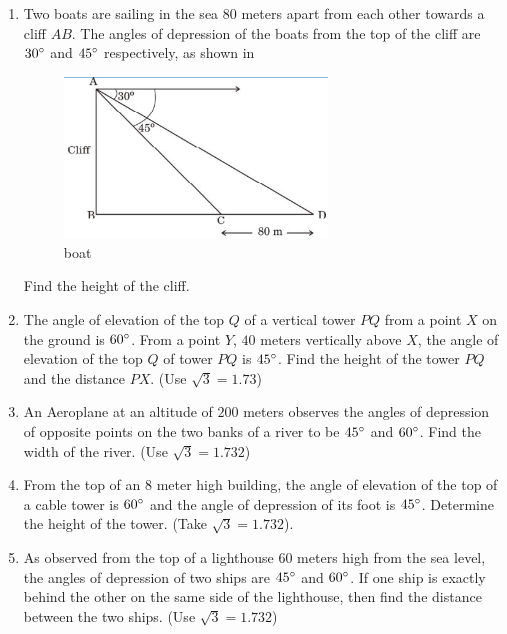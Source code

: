 \begin{enumerate}
    
    \hfill{}\item Two boats are sailing in the sea $80$ meters apart from each other towards a cliff $AB$. The angles of depression of the boats from the top of the cliff are $30\degree$ and $45\degree$ respectively, as shown in 
    
    \begin{figure}[H]
        \centering
        \includegraphics[width=70mm]{cbse-math/figs/boat.edit.jpeg}
        \caption{boat}
        \label{fig:boat.jpeg}
    \end{figure}
    
    Find the height of the cliff.
    
    \hfill{}\item The angle of elevation of the top $Q$ of a vertical tower $PQ$ from a point $X$ on the ground is $60\degree$. From a point $Y$, $40$ meters vertically above $X$, the angle of elevation of the top $Q$ of tower $PQ$ is $45\degree$. Find the height of the tower $PQ$ and the distance $PX$. (Use $\sqrt{3} = 1.73$)
    
    \hfill{}\item An Aeroplane at an altitude of $200$ meters observes the angles of depression of opposite points on the two banks of a river to be $45\degree$ and $60\degree$. Find the width of the river. (Use $\sqrt{3} = 1.732$)
    
    \hfill{}\item From the top of an $8$ meter high building, the angle of elevation of the top of a cable tower is $60\degree$ and the angle of depression of its foot is $45\degree$. Determine the height of the tower. (Take $\sqrt{3} = 1.732$).
    
    \hfill{}\item As observed from the top of a lighthouse $60$ meters high from the sea level, the angles of depression of two ships are $45\degree$ and $60\degree$. If one ship is exactly behind the other on the same side of the lighthouse, then find the distance between the two ships. (Use $\sqrt{3} = 1.732$)
    

\end{enumerate}

